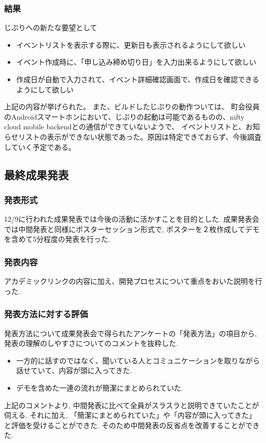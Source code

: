 \subsubsection{結果}
じぷりへの新たな要望として
\begin{itemize}
    \item イベントリストを表示する際に、更新日も表示されるようにして欲しい
    \item イベント作成時に、「申し込み締め切り日」を入力出来るようにして欲しい
    \item 作成日が自動で入力されて、イベント詳細確認画面で、作成日を確認できるようにして欲しい
\end{itemize}
上記の内容が挙げられた。
また、ビルドしたじぷりの動作ついては、
町会役員のAndroidスマートホンにおいて、じぷりの起動は可能であるものの、nifty cloud mobile backendとの通信ができていないようで、
イベントリストと、お知らせリストの表示ができない状態であった。原因は特定できておらず、今後調査していく予定である。

\subsection{最終成果発表}
\subsubsection{発表形式}
12/9に行われた成果発表では今後の活動に活かすことを目的とした. 成果発表会では中間発表と同様にポスターセッション形式で, ポスターを２枚作成してデモを含めて5分程度の発表を行った.
\subsubsection{発表内容}
アカデミックリンクの内容に加え、開発プロセスについて重点をおいた説明を行った.
\subsubsection{発表方法に対する評価}
発表方法について成果発表会で得られたアンケートの「発表方法」の項目から,  発表の理解のしやすさについてのコメントを抜粋した.
\begin{itemize}
    \item 一方的に話すのではなく、聞いている人とコミュニケーションを取りながら話せていて、内容が頭に入ってきた.
　\item デモを含めた一連の流れが簡潔にまとめられていた.
\end{itemize}
上記のコメントより, 中間発表に比べて全員がスラスラと説明できていたことが伺える. それに加え, 「簡潔にまとめられていた」や「内容が頭に入ってきた」と評価を受けることができた. そのため中間発表の反省点を改善することができた.
